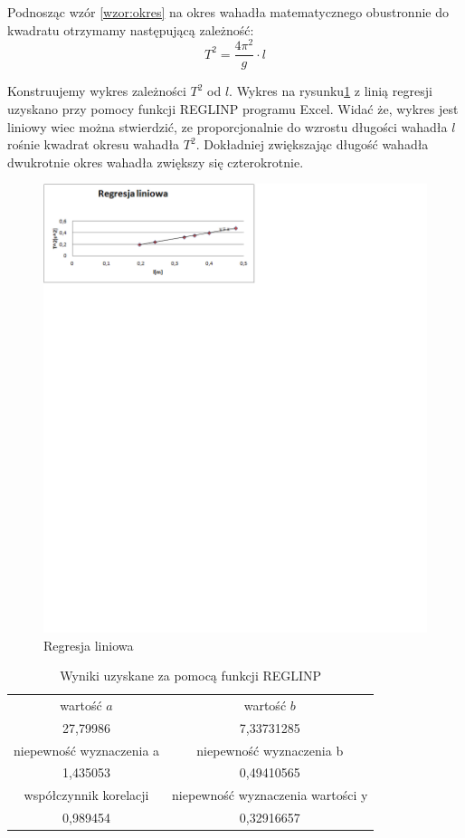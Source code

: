 \documentclass [a4paper,11pt]{article}
\begin{document}
Podnosząc wzór {\ref{wzor:okres}} na okres wahadła matematycznego obustronnie do kwadratu otrzymamy następującą zależność:
\begin{equation}
 T^2 = \frac{4 \pi^2}{g} \cdot l 
\end{equation}

\indent Konstruujemy wykres zależności $T^{2}$ od $l$. 
Wykres na rysunku{\ref{rys:2}} z linią regresji uzyskano przy pomocy funkcji REGLINP programu Excel. Widać że, wykres jest liniowy wiec można stwierdzić, ze proporcjonalnie do wzrostu długości wahadła $l$ rośnie kwadrat okresu wahadła $T^{2}$.
Dokładniej zwiększając długość wahadła dwukrotnie okres wahadła zwiększy się czterokrotnie.

\begin{figure}
\caption{Regresja liniowa}
\label{rys:2}
\centering
\includegraphics[width=1.2 \textwidth]{./wykres}
\end{figure}

\begin{table}[h!]
\centering
\caption{Wyniki uzyskane za pomocą funkcji REGLINP}
\begin{tabular}{c|c}\hline
\label{table2}
wartość $a$ & wartość $b$\\ 
27,79986 & 7,33731285  \\ \hline
niepewność wyznaczenia a & niepewność wyznaczenia b \\
1,435053 & 0,49410565 \\ \hline
współczynnik korelacji & niepewność wyznaczenia wartości y \\
0,989454 & 0,32916657 \\ \hline

\end{tabular}
\end{table}
\end{document}
